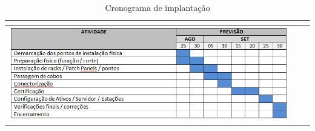 \begin{table}[h!]
\centering
\caption{Cronograma de implantação}
\label{tab6}
\begin{tabular}{|l|l|l|}
\hline
\multicolumn{1}{|l|}{} \\ \hline
\includegraphics[scale=0.8]{cronograma}        \\ \hline

\end{tabular}
\end{table}